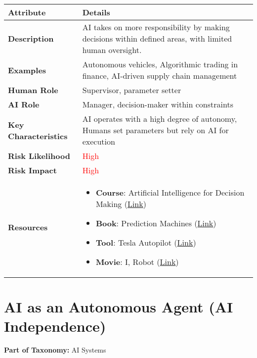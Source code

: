 \documentclass{article}
\begin{document}
\begin{longtable}{|p{4cm}|p{10cm}|}
\hline
\textbf{Attribute} & \textbf{Details} \\
\hline
\textbf{Description} & AI takes on more responsibility by making decisions within defined areas, with limited human oversight. \\
\hline
\textbf{Examples} & Autonomous vehicles, Algorithmic trading in finance, AI-driven supply chain management \\
\hline
\textbf{Human Role} & Supervisor, parameter setter \\
\hline
\textbf{AI Role} & Manager, decision-maker within constraints \\
\hline
\textbf{Key Characteristics} & AI operates with a high degree of autonomy, Humans set parameters but rely on AI for execution \\
\hline
\textbf{Risk Likelihood} & \textcolor{red}{High} \\
\hline
\textbf{Risk Impact} & \textcolor{red}{High} \\
\hline
\textbf{Resources} & \begin{itemize}
  \item \textbf{Course}: Artificial Intelligence for Decision Making (\href{https://www.edx.org/course/artificial-intelligence-for-decision-making}{Link})
  \item \textbf{Book}: Prediction Machines (\href{https://www.amazon.com/dp/1633695670}{Link})
  \item \textbf{Tool}: Tesla Autopilot (\href{https://www.tesla.com/autopilot}{Link})
  \item \textbf{Movie}: I, Robot (\href{https://www.imdb.com/title/tt0343818/}{Link})
\end{itemize} \\ \hline
\end{longtable}

\newpage
\section*{AI as an Autonomous Agent (AI Independence)}
\noindent \textbf{Part of Taxonomy:} AI Systems
\end{document}
